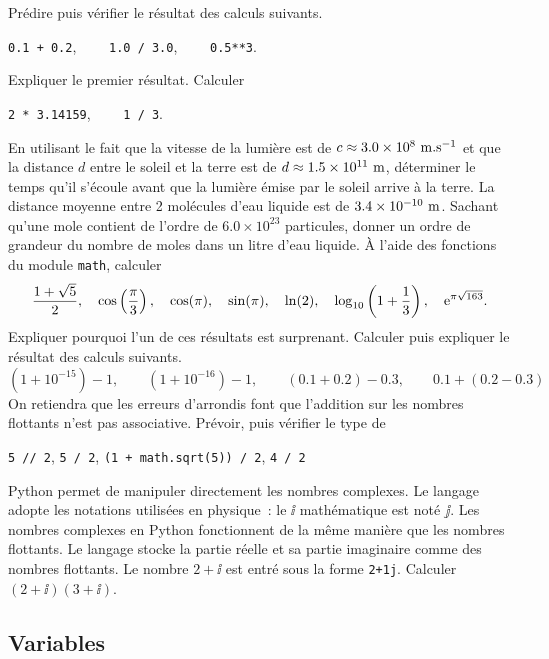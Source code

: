 \documentclass{magnoliaold}
\begin{document}
\begin{questions}
\question Prédire puis vérifier le résultat des calculs suivants.
  \begin{center}
  \verb_0.1 + 0.2_, $\qquad$\verb_1.0 / 3.0_, $\qquad$\verb_0.5**3_.
  \end{center}
  Expliquer le premier résultat.
\question Calculer
  \begin{center}
  \verb_2 * 3.14159_, $\qquad$\verb_1 / 3_.
  \end{center}
\question En utilisant le fait que la vitesse de la lumière est de $c \approx 3.0\times 10^{8}\ {\rm m}.{\rm s}^{-1}$ et que la distance $d$ entre le soleil et la terre est de $d \approx 1.5\times 10^{11}\ {\rm m}$, déterminer le temps qu'il s'écoule avant que la lumière émise par le soleil arrive à la terre.
\question La distance moyenne entre 2 molécules d'eau liquide est de $3.4\times 10^{-10}\ {\rm m}$. Sachant qu'une mole contient de l'ordre de $6.0\times 10^{23}$ particules, donner un ordre de grandeur du nombre de moles dans un litre d'eau liquide.
\question À l'aide des fonctions du module \verb!math!, calculer
  \[\frac{1+\sqrt{5}}{2}, \quad \cos\left(\frac{\pi}{3}\right), \quad \cos(\pi), \quad \sin(\pi), \quad\ln(2), \quad \log_{10}\left(1+\frac{1}{3}\right),\quad {\rm e}^{\pi\sqrt{163}}.\]
  Expliquer pourquoi l'un de ces résultats est surprenant.
\question Calculer puis expliquer le résultat des calculs suivants.
  \[(1 + 10^{-15}) - 1, \qquad (1 + 10^{-16}) - 1, \qquad (0.1 + 0.2) - 0.3, \qquad 0.1 + (0.2 - 0.3)\]
  On retiendra que les erreurs d'arrondis font que l'addition sur les nombres flottants n'est pas associative.
\question Prévoir, puis vérifier le type de
  \begin{center}
  \verb_5 // 2_, \quad \verb_5 / 2_, \quad \verb_(1 + math.sqrt(5)) / 2_, \quad \verb_4 / 2_
  \end{center}
\enonce Python permet de manipuler directement les nombres complexes. Le langage adopte les notations utilisées en physique~: le $\ii$ mathématique est noté $\jj$. Les nombres complexes en Python fonctionnent de la même manière que les nombres flottants. Le langage stocke la partie réelle et sa partie imaginaire comme des nombres flottants. Le nombre $2+\ii$ est entré sous la forme \verb_2+1j_.
\question Calculer $(2+\ii)(3+\ii)$.
\end{questions}

\subsection{Variables}
\end{document}
